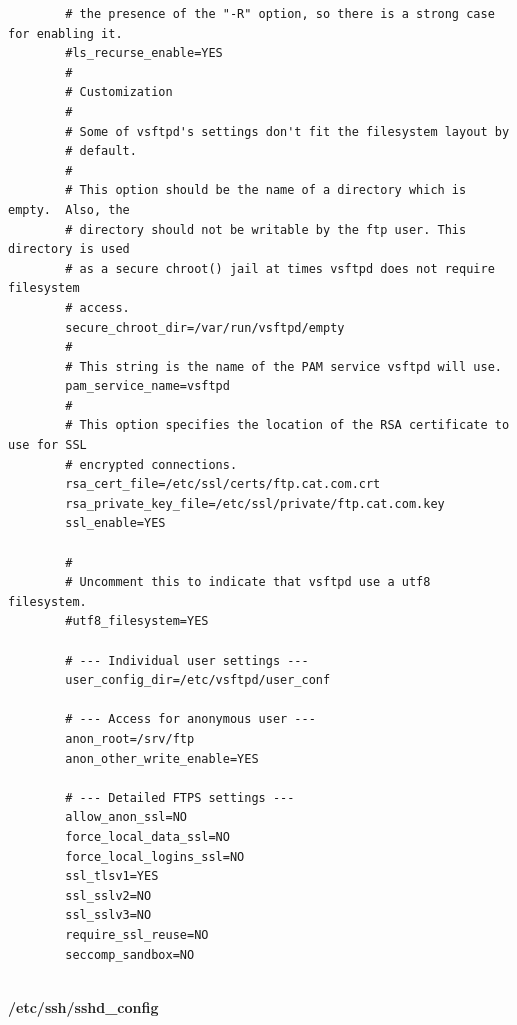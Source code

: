 \documentclass[14pt, a4paper]{extreport}
\begin{document}
\begin{verbatim}
		# the presence of the "-R" option, so there is a strong case for enabling it.
		#ls_recurse_enable=YES
		#
		# Customization
		#
		# Some of vsftpd's settings don't fit the filesystem layout by
		# default.
		#
		# This option should be the name of a directory which is empty.  Also, the
		# directory should not be writable by the ftp user. This directory is used
		# as a secure chroot() jail at times vsftpd does not require filesystem
		# access.
		secure_chroot_dir=/var/run/vsftpd/empty
		#
		# This string is the name of the PAM service vsftpd will use.
		pam_service_name=vsftpd
		#
		# This option specifies the location of the RSA certificate to use for SSL
		# encrypted connections.
		rsa_cert_file=/etc/ssl/certs/ftp.cat.com.crt
		rsa_private_key_file=/etc/ssl/private/ftp.cat.com.key
		ssl_enable=YES
		
		#
		# Uncomment this to indicate that vsftpd use a utf8 filesystem.
		#utf8_filesystem=YES
		
		# --- Individual user settings ---
		user_config_dir=/etc/vsftpd/user_conf
		
		# --- Access for anonymous user ---
		anon_root=/srv/ftp
		anon_other_write_enable=YES
		
		# --- Detailed FTPS settings ---
		allow_anon_ssl=NO
		force_local_data_ssl=NO
		force_local_logins_ssl=NO
		ssl_tlsv1=YES
		ssl_sslv2=NO
		ssl_sslv3=NO
		require_ssl_reuse=NO
		seccomp_sandbox=NO
		
	\end{verbatim}
	
	\textbf{/etc/ssh/sshd\_config}
	
\end{document}
